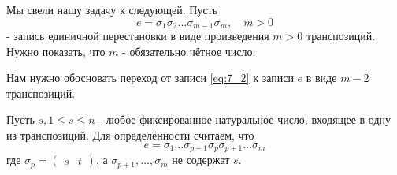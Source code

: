 \documentclass{article}
\begin{document}
Мы свели нашу задачу к следующей. Пусть \begin{equation}
\label{eq:7_2}
e = \sigma_1\sigma_2\dots\sigma_{m-1}\sigma_m,\quad m>0
\end{equation} - запись единичной перестановки в виде произведения $m > 0$ транспозиций. Нужно показать, что $m$ - обязательно чётное число.

Нам нужно обосновать переход от записи \eqref{eq:7_2} к записи $e$ в виде $m-2$ транспозиций.

Пусть $s, 1\leq s\leq n$ - любое фиксированное натуральное число, входящее в одну из транспозиций. Для определённости считаем, что \[
e = \sigma_1\dots\sigma_{p-1}\sigma_p\sigma_{p+1}\dots\sigma_m
\] где $\sigma_p = (\begin{matrix}s&t\end{matrix})$, а $\sigma_{p+1},\dots,\sigma_m$ не содержат $s$.
\end{document}

